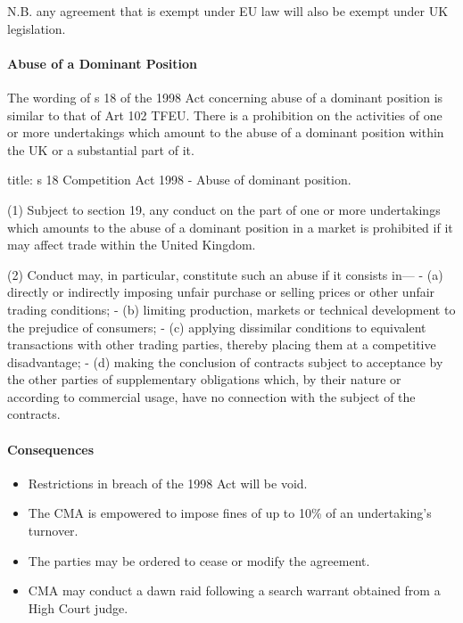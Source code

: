 \documentclass[
]{article}
\newenvironment{Shaded}{}{}
\newcommand{\NormalTok}[1]{#1}
\providecommand{\tightlist}{%
  \setlength{\itemsep}{0pt}\setlength{\parskip}{0pt}}
\begin{document}
N.B. any agreement that is exempt under EU law will also be exempt under
UK legislation.

\hypertarget{abuse-of-a-dominant-position}{%
\paragraph{Abuse of a Dominant
Position}\label{abuse-of-a-dominant-position}}

The wording of s 18 of the 1998 Act concerning abuse of a dominant
position is similar to that of Art 102 TFEU. There is a prohibition on
the activities of one or more undertakings which amount to the abuse of
a dominant position within the UK or a substantial part of it.

\begin{Shaded}
\begin{Highlighting}[]
\NormalTok{title: s 18 Competition Act 1998 {-} Abuse of dominant position.}

\NormalTok{(1) Subject to section 19, any conduct on the part of one or more undertakings which amounts to the abuse of a dominant position in a market is prohibited if it may affect trade within the United Kingdom.}

\NormalTok{(2) Conduct may, in particular, constitute such an abuse if it consists in—}
\NormalTok{{-} (a) directly or indirectly imposing unfair purchase or selling prices or other unfair trading conditions;}
\NormalTok{{-} (b) limiting production, markets or technical development to the prejudice of consumers;}
\NormalTok{{-} (c) applying dissimilar conditions to equivalent transactions with other trading parties, thereby placing them at a competitive disadvantage;}
\NormalTok{{-} (d) making the conclusion of contracts subject to acceptance by the other parties of supplementary obligations which, by their nature or according to commercial usage, have no connection with the subject of the contracts.}
\end{Highlighting}
\end{Shaded}

\hypertarget{consequences}{%
\paragraph{Consequences}\label{consequences}}

\begin{itemize}
\tightlist
\item
  Restrictions in breach of the 1998 Act will be void.
\item
  The CMA is empowered to impose fines of up to 10\% of an undertaking's
  turnover.
\item
  The parties may be ordered to cease or modify the agreement.
\item
  CMA may conduct a dawn raid following a search warrant obtained from a
  High Court judge.
\end{itemize}
\end{document}
